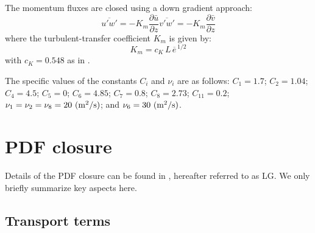 \documentclass[11pt,fleqn]{article}
\newcommand{\ptlder}[2]{\frac{\partial #1}{\partial #2}}
\begin{document}
The momentum fluxes are closed using a down gradient approach:
%
\begin{subequations}
\begin{equation}
\label{eq_upwp}
\overline{u'w'} = -K_m \ptlder{\bar{u}}{z}
\end{equation}
%
\begin{equation}
\label{eq_vpwp}
\overline{v'w'} = -K_m \ptlder{\bar{v}}{z}
\end{equation}
\end{subequations}
%
where the turbulent-transfer coefficient $K_m$ is given by:
%
\begin{equation}
\label{eq_Km}
K_m = c_K \, L \, \overline{e}^{\, 1/2}
\end{equation}
%
with $c_K = 0.548$ as in \citet{duynkerke1987a}.

The specific values of the constants $C_i$ and $\nu_i$
are as follows: $C_1 = 1.7$; $C_2 = 1.04$; $C_4 = 4.5$; $C_5 = 0$;
$C_6 = 4.85$; $C_7 = 0.8$; $C_8 = 2.73$; $C_{11} = 0.2$;
$\nu_1 = \nu_2 = \nu_8 = 20 \hbox{ (m$^2$/s)}$; 
and $\nu_6 = 30 \hbox{ (m$^2$/s)}$. 

\section{PDF closure}

Details of the PDF closure can be found in \citet{larson2005a}, hereafter
referred to as LG. We only briefly summarize key aspects here.

\subsection{Transport terms}
\end{document}

